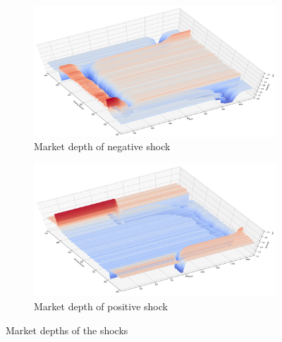 
\begin{figure}
    \centering
    \begin{subfigure}{.5\textwidth}
      \centering
      \includegraphics[width=\linewidth]{plots/shocks_neg_market_depth_in_equilibrium.png}
      \caption{Market depth of negative shock}
      \label{fig:market_depth_neg_shock}
    \end{subfigure}%
    \begin{subfigure}{.5\textwidth}
      \centering
      \includegraphics[width=\linewidth]{plots/shocks_pos_market_depth_in_equilibrium.png}
      \caption{Market depth of positive shock}
      \label{fig:market_depth_pos_shock}
    \end{subfigure}
    \caption{Market depths of the shocks}
    \label{fig:market_depths_shocks}
\end{figure}
